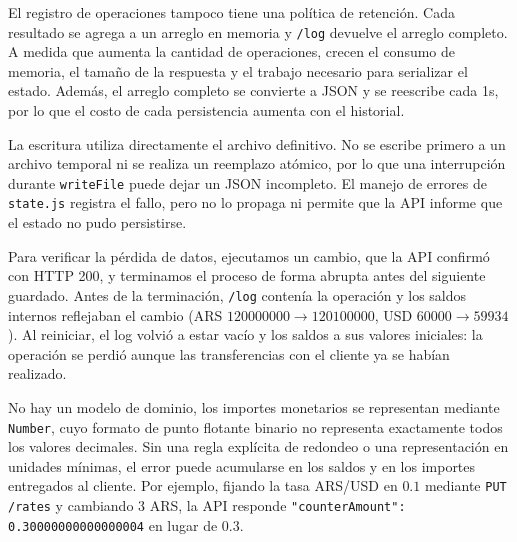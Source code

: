     \begin{code}
        
        \caption{Sección crítica sin exclusión mutua en \texttt{app/exchange.js}.}
        \label{lst:race_condition}
    \end{code}

    El registro de operaciones tampoco tiene una política de retención. Cada resultado
    se agrega a un arreglo en memoria y \texttt{/log} devuelve el arreglo completo.
    A medida que aumenta la cantidad de operaciones, crecen el consumo de memoria, el
    tamaño de la respuesta y el trabajo necesario para serializar el estado. Además,
    el arreglo completo se convierte a JSON y se reescribe cada 1s, por lo que el
    costo de cada persistencia aumenta con el historial.

    \begin{code}
        
        \caption{Crecimiento, consulta y persistencia del log en \texttt{app/exchange.js}, \texttt{app/app.js} y \texttt{app/state.js}.}
        \label{lst:log_growth}
    \end{code}

    La escritura utiliza directamente el archivo definitivo. No se escribe primero a
    un archivo temporal ni se realiza un reemplazo atómico, por lo que una interrupción
    durante \texttt{writeFile} puede dejar un JSON incompleto. El manejo de errores de
    \texttt{state.js} registra el fallo, pero no lo propaga ni permite que la API informe
    que el estado no pudo persistirse.

    Para verificar la pérdida de datos, ejecutamos un cambio, que la API confirmó con HTTP 200,
    y terminamos el proceso de forma abrupta antes del siguiente guardado. Antes de la
    terminación, \texttt{/log} contenía la operación y los saldos internos reflejaban el cambio
    (ARS $120000000 \to 120100000$, USD $60000 \to 59934$). Al reiniciar, el log volvió a estar
    vacío y los saldos a sus valores iniciales: la operación se perdió aunque las
    transferencias con el cliente ya se habían realizado.

    \begin{code}
        
        \caption{Escritura directa y no atómica del estado en \texttt{app/state.js}.}
        \label{lst:save}
    \end{code}

    No hay un modelo de dominio, los importes monetarios se representan mediante \texttt{Number}, cuyo formato de
    punto flotante binario no representa exactamente todos los valores decimales. Sin
    una regla explícita de redondeo o una representación en unidades mínimas, el error
    puede acumularse en los saldos y en los importes entregados al cliente. Por ejemplo,
    fijando la tasa ARS/USD en $0.1$ mediante \texttt{PUT /rates} y cambiando 3 ARS, la API
    responde \texttt{"counterAmount": 0.30000000000000004} en lugar de $0.3$.

